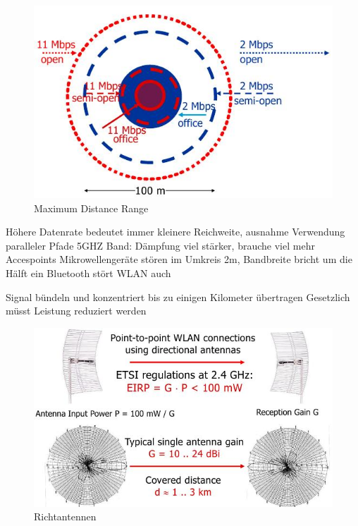 \documentclass[ngerman,a4paper,12pt]{scrreprt}
\begin{document}
\begin{figure}[H]
	\centering
	 \includegraphics[width=\textwidth]{img/V6.12.jpg}
	 \caption{Maximum Distance Range}
	\label{}
\end{figure}

\ul
	\li Höhere Datenrate bedeutet immer kleinere Reichweite, ausnahme Verwendung paralleler Pfade
	\li 5GHZ Band: Dämpfung viel stärker, brauche viel mehr Accespoints
	\li Mikrowellengeräte stören im Umkreis 2m, Bandbreite bricht  um die Hälft ein
	\li Bluetooth stört WLAN auch
\ulE

\ul
	\li Signal bündeln und konzentriert bis zu einigen Kilometer übertragen
	\li Gesetzlich müsst Leistung reduziert werden
\ulE

\begin{figure}[H]
	\centering
	 \includegraphics[width=\textwidth]{img/V6.13.jpg}
	 \caption{Richtantennen}
	\label{}
\end{figure}
\end{document}
